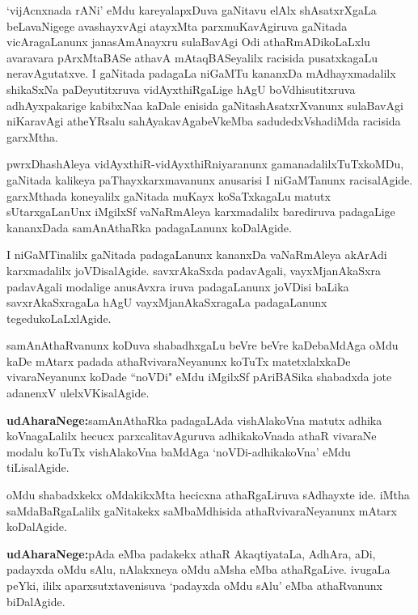 `vijAcnxnada rANi' eMdu kareyalapxDuva gaNitavu elAlx shAsatxrXgaLa beLavaNigege avashayxvAgi atayxMta parxmuKavAgiruva gaNitada vicAragaLanunx janasAmAnayxru sulaBavAgi Odi athaRmADikoLaLxlu avaravara pArxMtaBASe athavA mAtaqBASeyalilx racisida pusatxkagaLu neravAgutatxve. I gaNitada padagaLa niGaMTu kananxDa mAdhayx\-madalilx shikaSxNa paDeyutitxruva vidAyxthiRgaLige hAgU boVdhisutitxruva adhAyxpakarige kabibxNaa kaDale enisida gaNitashAsatxrXvanunx sulaBavAgi niKaravAgi atheYRsalu sahAyakavAgabeVkeMba sadudedxVshadiMda racisida garxMtha.

pwrxDhashAleya vidAyxthiR-vidAyxthiRniyaranunx gamanadalilxTuTxkoMDu, gaNitada kalikeya paThayxkarxmavanunx anusarisi I niGaMTanunx racisalAgide. garxMthada koneyalilx gaNitada muKayx koSaTxkagaLu matutx sUtarxgaLanUnx iMgilxSf vaNaRmAleya karxmadalilx barediruva padagaLige kananxDada samAnAthaRka padagaLanunx koDalAgide.

I niGaMTinalilx gaNitada padagaLanunx kananxDa vaNaRmAleya akArAdi karxmadalilx joVDisalAgide. savxrAkaSxda padavAgali, vayxMjanAkaSxra padavAgali modalige anusAvxra iruva padagaLanunx joVDisi baLika savxrAkaSxragaLa hAgU vayxMjanAkaSxragaLa padagaLanunx tegedukoLaLxlAgide.

samAnAthaRvanunx koDuva shabadhxgaLu beVre beVre kaDebaMdAga oMdu kaDe mAtarx padada athaRvivaraNeyanunx koTuTx matetxlalxkaDe vivaraNeyanunx koDade ``noVDi" eMdu iMgilxSf pAriBASika shabadxda jote adanenxV ulelxVKisalAgide.

\textbf{udAharaNege:}\quad samAnAthaRka padagaLAda vishAlakoVna matutx adhika koVnagaLalilx hecucx parxcalitavAguruva adhikakoVnada athaR vivaraNe modalu koTuTx vishAlakoVna baMdAga `noVDi-adhikakoVna' eMdu tiLisalAgide.

oMdu shabadxkekx oMdakikxMta hecicxna athaRgaLiruva sAdhayxte ide. iMtha saMdaBaRgaLalilx gaNitakekx saMbaMdhisida athaRvivaraNeyanunx mAtarx koDalAgide.

\textbf{udAharaNege:}\quad pAda eMba padakekx athaR AkaqtiyataLa, AdhAra, aDi, padayxda oMdu sAlu, nAlakxneya oMdu aMsha eMba athaRgaLive. ivugaLa peYki, ililx aparxsutxtavenisuva `padayxda oMdu sAlu' eMba athaRvanunx biDalAgide.

\newpage

